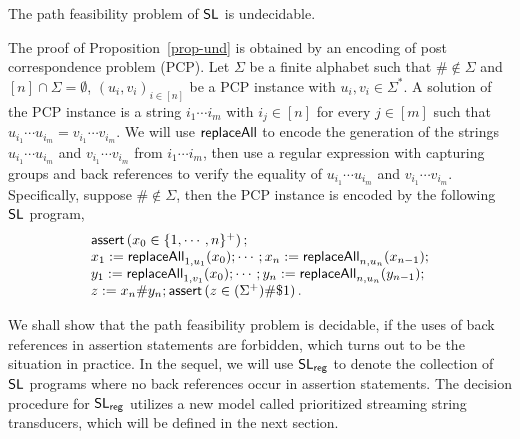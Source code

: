 \begin{proposition}\label{prop-und}
The path feasibility problem of $\mathsf{SL}$ is undecidable.
\end{proposition}

The proof of Proposition~\ref{prop-und} is obtained by an encoding of post correspondence problem (PCP).
Let $\Sigma$ be a finite alphabet such that $\# \not\in \Sigma$ and $[n] \cap \Sigma = \emptyset$, $(u_i, v_i)_{i \in [n]}$ be a PCP instance with $u_i, v_i \in \Sigma^\ast$. A solution of the PCP instance is a string $i_1 \cdots i_m$ with $i_j \in [n]$ for every $j \in [m]$ such that $u_{i_1} \cdots u_{i_m} = v_{i_1} \cdots v_{i_m}$. We will use $\mathsf{replaceAll}$ to encode the generation of the strings $u_{i_1} \cdots u_{i_m}$ and $v_{i_1} \cdots v_{i_m}$ from $i_1 \cdots i_m$, then use a regular expression with  capturing groups and back references to verify the equality of $u_{i_1} \cdots u_{i_m}$ and $v_{i_1} \cdots v_{i_m}$. Specifically, suppose $\# \not \in \Sigma$, then the PCP instance is encoded by the following $\mathsf{SL}$ program,
\[
\begin{array}{l}
\textsf{assert}\left(x_0 \in \{1, \cdots, n\}^+\right); \\
x_1 := \mathsf{replaceAll}_{1, u_1}(x_0); \cdots; x_n:=\mathsf{replaceAll}_{n, u_n}(x_{n-1}); \\
y_1:=\mathsf{replaceAll}_{1, v_1}(x_0); \cdots; y_n:=\mathsf{replaceAll}_{n, u_n}(y_{n-1});\\
z:= x_n \# y_n; \textsf{assert}\left(z \in (\Sigma^+)\#\$1\right).
\end{array}
\]

We shall show that the path feasibility problem is decidable, if the uses of back references in assertion statements are forbidden, which turns out to be the situation in practice. In the sequel, we will use $\mathsf{SL}_{\sf reg}$ to denote the collection of $\mathsf{SL}$ programs where no back references occur in assertion statements. The decision procedure for $\mathsf{SL}_{\sf reg}$ utilizes a new model called prioritized streaming string transducers, which will be defined in the next section.
